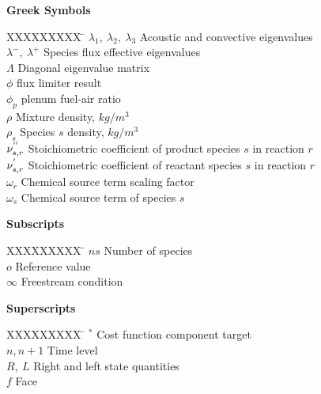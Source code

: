 \textbf{Greek Symbols}
\begin{tabbing}
  XXXXXXXXX \= \kill%
  $\lambda_1,\ \lambda_2,\ \lambda_3$ \> Acoustic and convective eigenvalues \\
  $\lambda^-,\ \lambda^+$ \> Species flux effective eigenvalues \\
  $\Lambda$ \> Diagonal eigenvalue matrix \\
  $\phi$ \> flux limiter result \\
  $\phi_p$ \> plenum fuel-air ratio \\
  $\rho$ \> Mixture density, $kg/m^3$ \\
  $\rho_s$ \> Species $s$ density, $kg/m^3$ \\
  $\nu_{s,r}^{''}$ \> Stoichiometric coefficient of product species $s$ in reaction $r$ \\
  $\nu_{s,r}^{'}$ \> Stoichiometric coefficient of reactant species $s$ in reaction $r$ \\
  $\omega_r$ \> Chemical source term scaling factor \\
  $\omega_s$ \> Chemical source term of species $s$ \\
\end{tabbing}

\textbf{Subscripts}
\begin{tabbing}
  XXXXXXXXX \= \kill%
  $ns$ \> Number of species \\
  $o$ \> Reference value \\
  $\infty$ \> Freestream condition \\
\end{tabbing}

\textbf{Superscripts}
\begin{tabbing}
  XXXXXXXXX \= \kill%
  $^*$ \> Cost function component target \\
  $n, n+1$ \> Time level \\
  $R,\ L$ \> Right and left state quantities \\
  $f$ \> Face
\end{tabbing}

